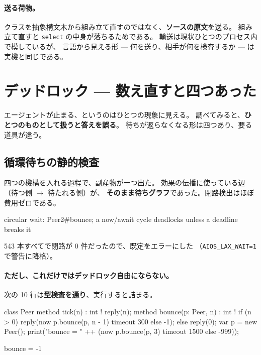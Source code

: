 \documentclass[11pt,a4paper]{ltjsarticle}
\theoremstyle{definition}
\theoremstyle{remark}
\begin{document}
\paragraph{送る荷物。}
クラスを抽象構文木から組み立て直すのではなく、\textbf{ソースの原文}を送る。
組み立て直すと \texttt{select} の中身が落ちるためである。
輸送は現状ひとつのプロセス内で模しているが、
言語から見える形 --- 何を送り、相手が何を検査するか --- は実機と同じである。

\section{デッドロック --- 数え直すと四つあった}
\label{sec:dl}

エージェントが止まる、というのはひとつの現象に見える。
調べてみると、\textbf{ひとつのものとして扱うと答えを誤る}。
待ちが返らなくなる形は四つあり、要る道具が違う。

\subsection{循環待ちの静的検査}
\label{sec:deadlock}

四つの機構を入れる過程で、副産物が一つ出た。
効果の伝播に使っている辺（待つ側 $\to$ 待たれる側）が、
\textbf{そのまま待ちグラフ}であった。閉路検出はほぼ費用ゼロである。

\begin{term}
 circular wait: Peer2#bounce;
             a now/await cycle deadlocks unless a deadline breaks it
\end{term}

543 本すべてで閉路が 0 件だったので、既定をエラーにした
（\texttt{AIOS\_LAX\_WAIT=1} で警告に降格）。

\paragraph{ただし、これだけではデッドロック自由にならない。}
次の 10 行は\textbf{型検査を通り}、実行すると詰まる。

\begin{aipl}
class Peer {
  method tick(n) : int !{} { reply(n); }
  method bounce(p: Peer, n) : int !{} {
    if (n > 0) { reply(now p.bounce(p, n - 1) timeout 300 else -1); }
    else { reply(0); }
  }
}
var p = new Peer();
print("bounce = " ++ (now p.bounce(p, 3) timeout 1500 else -999));
\end{aipl}
\begin{term}
bounce = -1
\end{term}
\end{document}
